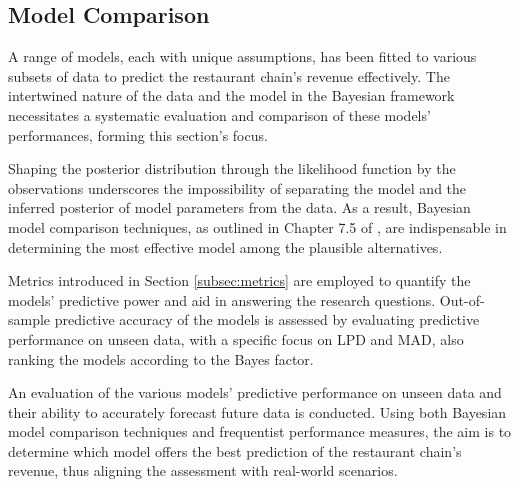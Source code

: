 \subsection{Model Comparison}

A range of models, each with unique assumptions, has been fitted to
various subsets of data to predict the restaurant chain's revenue
effectively. The intertwined nature of the data and the model in the Bayesian
framework necessitates a systematic evaluation and comparison of these models'
performances, forming this section's focus.

Shaping the posterior distribution through the likelihood function by
the observations underscores the impossibility of separating the model and the
inferred posterior of model parameters from the data. As a result, Bayesian
model comparison techniques, as outlined in Chapter 7.5 of
\cite{statrethinking}, are indispensable in determining the most effective
model among the plausible alternatives.

Metrics introduced in Section \ref{subsec:metrics} are employed to quantify the
models' predictive power and aid in answering the research questions.
Out-of-sample predictive accuracy of the models is assessed by evaluating
predictive performance on unseen data, with a specific focus on LPD and MAD, also
ranking the models according to the Bayes factor.

An evaluation of the various models' predictive performance on unseen data and their
ability to accurately forecast future data is conducted. Using both Bayesian
model comparison techniques and frequentist performance measures, the aim is to
determine which model offers the best prediction of the restaurant chain's
revenue, thus aligning the assessment with real-world scenarios.

